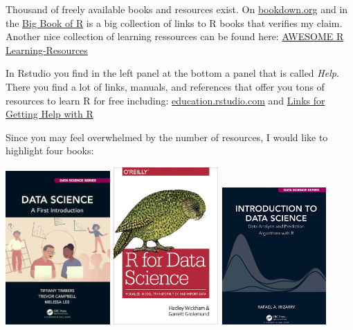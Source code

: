\documentclass[
  12pt,
  oneside]{book}
\theoremstyle{definition}
\theoremstyle{definition}
\theoremstyle{definition}
\theoremstyle{definition}
\theoremstyle{remark}
\begin{document}
Thousand of freely available books and resources exist. On \href{https://bookdown.org}{bookdown.org} and in the \href{www.bigbookofr.com}{Big Book of R} is a big collection of links to R books that verifies my claim. Another nice collection of learning ressources can be found here:
\href{https://github.com/iamericfletcher/awesome-r-learning-resources}{AWESOME R Learning-Resources}

In Rstudio you find in the left panel at the bottom a panel that is called \emph{Help}. There you find a lot of links, manuals, and references that offer you tons of resources to learn R for free including:
\href{https://education.rstudio.com/}{education.rstudio.com}
and \href{https://support.rstudio.com/hc/en-us/articles/200552336-Getting-Help-with-R}{Links for Getting Help with R}

Since you may feel overwhelmed by the number of resources, I would like to highlight four books:

\includegraphics[width=0.3\textwidth,height=\textheight]{fig/ds-a-first-intro-cover.jpg}
\includegraphics[width=0.3\textwidth,height=\textheight]{fig/rfordatas.png}
\includegraphics[width=0.3\textwidth,height=\textheight]{fig/irizarrybook.png}
\end{document}
